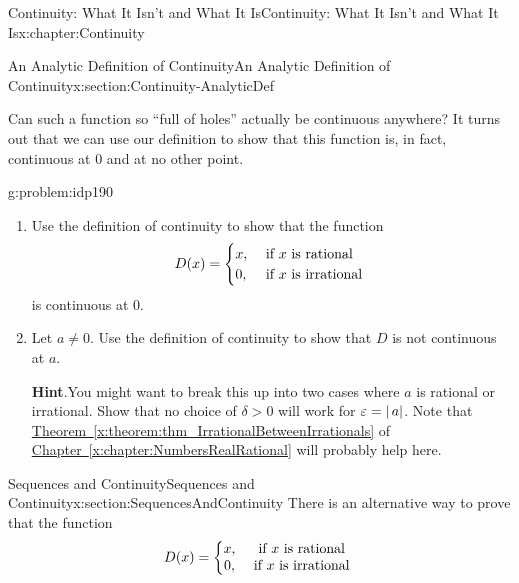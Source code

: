 \begin{chapterptx}{Continuity: What It Isn't and What It Is}{}{Continuity: What It Isn't and What It Is}{}{}{x:chapter:Continuity}
\begin{sectionptx}{An Analytic Definition of Continuity}{}{An Analytic Definition of Continuity}{}{}{x:section:Continuity-AnalyticDef}
\begin{image}{0.2}{0.6}{0.2}
		\end{image}%
		Can such a function so ``full of holes'' actually be continuous anywhere?  It turns out that we can use our definition to show that this function is, in fact, continuous at \(0\) and at no other point.%
		\begin{problem}{}{g:problem:idp190}%
			\begin{enumerate}[font=\bfseries,label=(\alph*),ref=\alph*]
				\item{}Use the definition of continuity to show that the function%
				\begin{equation*}
					D(x)= \begin{cases}
						x,& \text{ if } x\text{ is rational } \\
						0,& \text{ if } x\text{ is irrational } \end{cases} 
				\end{equation*}
				is continuous at \(0\).%
				\item{}Let \(a\neq 0\).  Use the definition of continuity to show that \(D\) is not continuous at \(a\).%
				\par\smallskip%
				\noindent\textbf{\blocktitlefont Hint}.\hypertarget{g:hint:idp191}{}\quad{}You might want to break this up into two cases where \(a\) is rational or irrational.  Show that no choice of \(\delta>0\) will work for \(\varepsilon=|\,a|\).  Note that \hyperref[x:theorem:thm_IrrationalBetweenIrrationals]{Theorem~{\xreffont\ref{x:theorem:thm_IrrationalBetweenIrrationals}}} of \hyperref[x:chapter:NumbersRealRational]{Chapter~{\xreffont\ref{x:chapter:NumbersRealRational}}} will probably help here.%
			\end{enumerate}
		\end{problem}
	\end{sectionptx}
	\typeout{************************************************}
	\typeout{************************************************}
	\begin{sectionptx}{Sequences and Continuity}{}{Sequences and Continuity}{}{}{x:section:SequencesAndContinuity}
		There is an alternative way to prove that the function%
		\begin{equation*}
			D(x)=\left\{ \begin{matrix}x\text{,} & \text{ if } x\text{ is rational } \\ 0\text{,} & \text{ if } x\text{ is irrational } \end{matrix} \right.
		\end{equation*}

\end{sectionptx}
\end{chapterptx}
